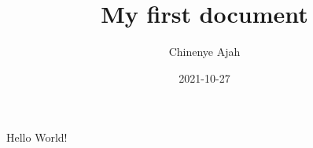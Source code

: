 \documentclass{article}
\title{My first document}
\date{2021-10-27}
\author{Chinenye Ajah}
\begin{document}
	\maketitle
	\newpage
	Hello World!
\end{document}
